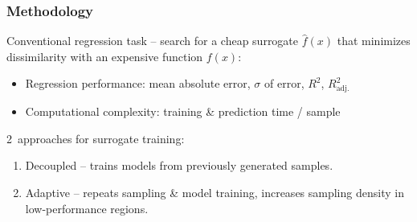 \begin{frame}
	\frametitle{Methodology}
		Conventional regression task -- search for a cheap surrogate $\hat{f}(x)$ that
		minimizes dissimilarity with an expensive function $f(x)$:

		\begin{itemize}
			\item
				Regression performance: mean absolute error, $\sigma$ of
				error, $R^2$, $R^2_\text{adj.}$
			\item
				Computational complexity:
				training \& prediction time / sample
		\end{itemize}

		\vspace{2em}

		2~approaches for surrogate training:
		\begin{enumerate}
			\item
				Decoupled -- trains models from previously generated samples.
			\item
				Adaptive -- repeats sampling \& model training, increases
				sampling density in low-performance regions.
		\end{enumerate}
\end{frame}

